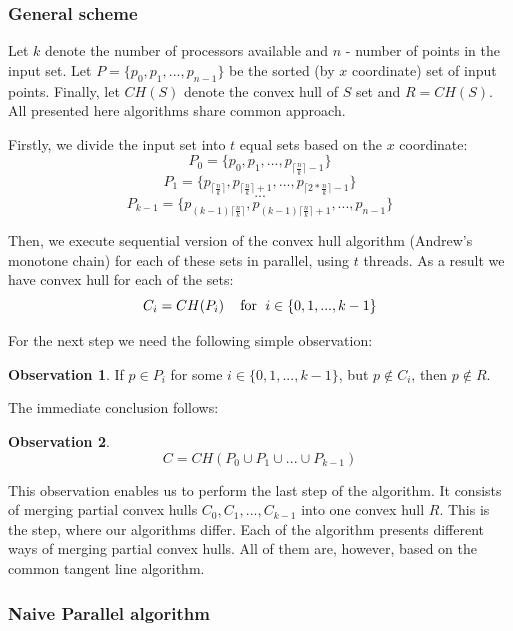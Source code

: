 \documentclass[letterpaper]{article}
\theoremstyle{definition}
\newtheorem{observation}{Observation}
\begin{document}
\subsubsection{General scheme}
Let $k$ denote the number of processors available and $n$ - number of points in the input set.
Let $P = \{p_0, p_1, ..., p_{n-1} \}$ be the sorted (by $x$ coordinate) set of input points.
Finally, let $CH(S)$ denote the convex hull of $S$ set and $R=CH(S)$.
All presented here algorithms share common approach.

Firstly, we divide the input set into $t$ equal sets based on the $x$ coordinate:
$$P_0 = \{p_0, p_1, ..., p_{\lceil{\frac{n}{k}}\rceil - 1}\}$$
$$P_1 = \{p_{\lceil{\frac{n}{k}}\rceil}, p_{\lceil{\frac{n}{k}}\rceil + 1}, ..., p_{\lceil{2 * \frac{n}{k}}\rceil - 1}\}$$
$$...$$
$$P_{k-1} = \{p_{(k-1)\lceil{\frac{n}{k}}\rceil}, p_{(k-1)\lceil{\frac{n}{k}}\rceil + 1}, ..., p_{n- 1} \}$$


Then, we execute sequential version of the convex hull algorithm (Andrew's monotone chain) for each of these sets in parallel, using $t$ threads.
As a result we have convex hull for each of the sets:
$$C_i = CH(P_i) \textrm{\;\;\; for \;} i \in \{0, 1, ..., k - 1\}$$

For the next step we need the following simple observation:
\begin{observation}
If $p \in P_i$ for some $i \in \{0, 1, ..., k - 1\}$, but $p \notin C_i$, then $p \notin R$.
\end{observation}

The immediate conclusion follows:
\begin{observation}
$$C = CH(P_0 \cup P_1 \cup ... \cup P_{k - 1})$$
\end{observation}

This observation enables us to perform the last step of the algorithm.
It consists of merging partial convex hulls $C_0, C_1, ..., C_{k - 1}$ into one convex hull $R$.
This is the step, where our algorithms differ.
Each of the algorithm presents different ways of merging partial convex hulls.
All of them are, however, based on the common tangent line algorithm.

\subsubsection{Naive Parallel algorithm}
\end{document}

